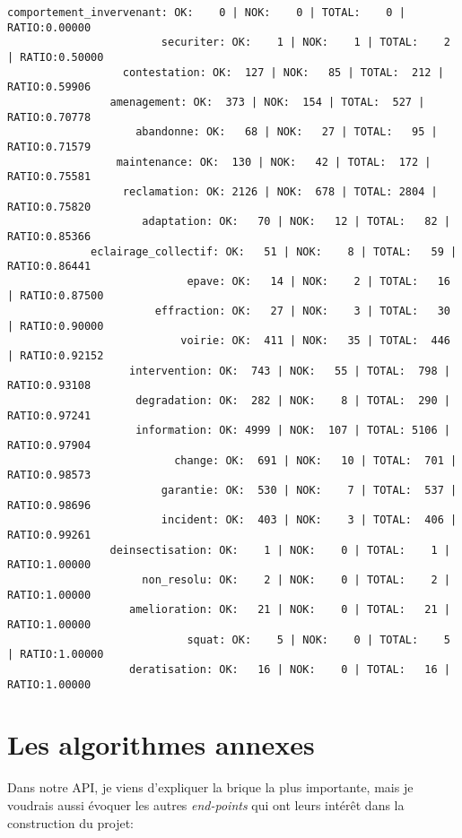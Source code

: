 \begin{lstlisting}
comportement_invervenant: OK:    0 | NOK:    0 | TOTAL:    0 | RATIO:0.00000
                        securiter: OK:    1 | NOK:    1 | TOTAL:    2 | RATIO:0.50000
                  contestation: OK:  127 | NOK:   85 | TOTAL:  212 | RATIO:0.59906
                amenagement: OK:  373 | NOK:  154 | TOTAL:  527 | RATIO:0.70778
                    abandonne: OK:   68 | NOK:   27 | TOTAL:   95 | RATIO:0.71579
                 maintenance: OK:  130 | NOK:   42 | TOTAL:  172 | RATIO:0.75581
                  reclamation: OK: 2126 | NOK:  678 | TOTAL: 2804 | RATIO:0.75820
                     adaptation: OK:   70 | NOK:   12 | TOTAL:   82 | RATIO:0.85366
             eclairage_collectif: OK:   51 | NOK:    8 | TOTAL:   59 | RATIO:0.86441
                            epave: OK:   14 | NOK:    2 | TOTAL:   16 | RATIO:0.87500
                       effraction: OK:   27 | NOK:    3 | TOTAL:   30 | RATIO:0.90000
                           voirie: OK:  411 | NOK:   35 | TOTAL:  446 | RATIO:0.92152
                   intervention: OK:  743 | NOK:   55 | TOTAL:  798 | RATIO:0.93108
                    degradation: OK:  282 | NOK:    8 | TOTAL:  290 | RATIO:0.97241
                    information: OK: 4999 | NOK:  107 | TOTAL: 5106 | RATIO:0.97904
                          change: OK:  691 | NOK:   10 | TOTAL:  701 | RATIO:0.98573
                        garantie: OK:  530 | NOK:    7 | TOTAL:  537 | RATIO:0.98696
                        incident: OK:  403 | NOK:    3 | TOTAL:  406 | RATIO:0.99261
                deinsectisation: OK:    1 | NOK:    0 | TOTAL:    1 | RATIO:1.00000
                     non_resolu: OK:    2 | NOK:    0 | TOTAL:    2 | RATIO:1.00000
                   amelioration: OK:   21 | NOK:    0 | TOTAL:   21 | RATIO:1.00000
                            squat: OK:    5 | NOK:    0 | TOTAL:    5 | RATIO:1.00000
                   deratisation: OK:   16 | NOK:    0 | TOTAL:   16 | RATIO:1.00000
\end{lstlisting}
\pagebreak

\section{Les algorithmes annexes}

Dans notre API, je viens d'expliquer la brique la plus importante, mais je voudrais aussi évoquer les autres \textit{end-points} qui ont leurs intérêt dans la construction du projet:

